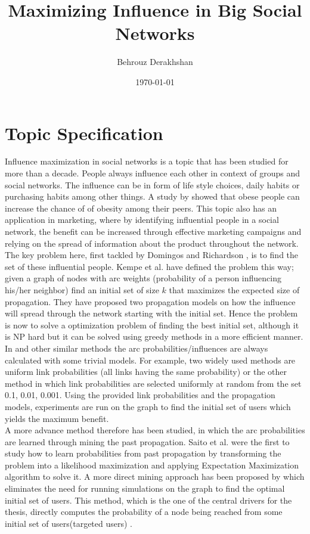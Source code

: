 \documentclass[english]{tktltiki}
\begin{document}
\onehalfspacing

\title{Maximizing Influence in Big Social Networks}
\author{Behrouz Derakhshan}
\date{\today}

\maketitle


\section{Topic Specification}
Influence maximization in social networks is a topic that has been studied for more than a decade. People always influence each other in context of groups and social networks. The influence can be in form of life style choices, daily habits or purchasing habits among other things. A study by \cite{christ07} showed that obese people can increase the chance of of obesity among their peers. This topic also has an application in marketing, where by identifying influential people in a social network, the benefit can be increased through effective marketing campaigns and relying on the spread of information about the product throughout the network. The key problem here, first tackled by Domingos and Richardson \cite{domingo01}, is to find the set of these influential people. 
Kempe et al.\cite{kempe03} have defined the problem this way; given a graph of nodes with arc weights (probability of a person influencing his/her neighbor) find an initial set of size $k$ that maximizes the expected size of propagation. They have  proposed two propagation models on how the influence will spread through the network starting with the initial set. Hence the problem is now to solve a optimization problem of finding the best initial set, although it is NP hard but it can be solved using greedy methods in a more efficient manner. In \cite{kempe03} and other similar methods the arc probabilities/influences are always calculated with some trivial models. For example, two widely used methods are uniform link probabilities (all links having the same probability) or the other method in which link probabilities are selected uniformly at random from the set {0.1, 0.01, 0.001}. Using the provided link probabilities and the propagation models, experiments are run on the graph to find the initial set of users which yields the maximum benefit.  \\
A more advance method therefore has been studied, in which the arc probabilities are learned through mining the past propagation. Saito et al. \cite{saito08} were the first to study how to learn probabilities from past propagation by transforming the problem into a likelihood maximization and applying Expectation Maximization algorithm to solve it. A more direct mining approach has been proposed by \cite{goyal11} which eliminates the need for running simulations on the graph to find the optimal initial set of users. This method, which is the one of the central drivers for the thesis, directly computes the probability of a node being reached from some initial set of users(targeted users) . \\
\end{document}
